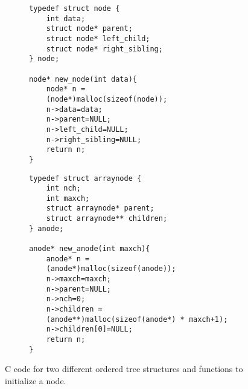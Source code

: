 \begin{figure}
    \begin{subfigure}[t]{.5 \textwidth}
	\begin{center}

	    \begin{Verbatim}
typedef struct node {
    int data;
    struct node* parent;
    struct node* left_child;
    struct node* right_sibling;
} node;

node* new_node(int data){
    node* n = 
	(node*)malloc(sizeof(node));
    n->data=data;
    n->parent=NULL;
    n->left_child=NULL;
    n->right_sibling=NULL;
    return n;
}
	    \end{Verbatim}
	\end{center}

	\label{fig:}
    \end{subfigure}
    \begin{subfigure}[t]{.5 \textwidth}
	\begin{center}

	    \begin{Verbatim}
typedef struct arraynode {
    int nch; 
    int maxch;
    struct arraynode* parent;
    struct arraynode** children;
} anode;

anode* new_anode(int maxch){
    anode* n = 
	(anode*)malloc(sizeof(anode));
    n->maxch=maxch;
    n->parent=NULL;
    n->nch=0;
    n->children =
	(anode**)malloc(sizeof(anode*) * maxch+1);
    n->children[0]=NULL; 
    return n;
}
	    \end{Verbatim}
	\end{center}
	\label{fig:}
    \end{subfigure}

    \cprotect\caption{C code for two different ordered tree structures and functions to initialize a node.}
    \label{fig:otreeCode}
\end{figure}



